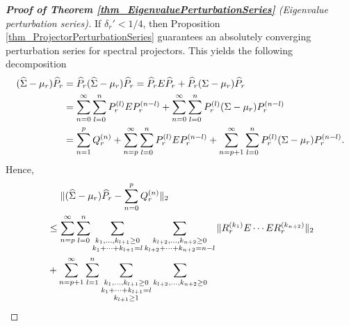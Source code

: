 \documentclass[a4paper,11pt]{article} %
\numberwithin{equation}{section}
\theoremstyle{definition}
\theoremstyle{remark}
\theoremstyle{plain}
\begin{document}
\begin{proof} %
  [\normalfont \textbf{Proof of Theorem \ref{thm_EigenvaluePerturbationSeries}} (Eigenvalue perturbation series)]
  \label{prf_EigenvaluePerturbationSeries} 
  If \( \delta_{r}' < 1/4 \), then Proposition \ref{thm_ProjectorPerturbationSeries} guarantees an absolutely converging perturbation series for spectral projectors.
  This yields the following decomposition
  \begin{align}
                          (\widehat{\Sigma} - \mu_{r}) \widehat{P}_{r}  
    & = 
          \widehat{P}_{r} (\widehat{\Sigma} - \mu_{r}) \widehat{P}_{r}  
      = 
          \widehat{P}_{r} E \widehat{P}_{r} + \widehat{P}_{r} ( \Sigma - \mu_{r} ) \widehat{P}_{r}
    \\
    & =
          \sum_{n = 0}^{\infty} \sum_{l = 0}^{n} P_{r}^{(l)} E                P_{r}^{(n - l)} 
        + \sum_{n = 0}^{\infty} \sum_{l = 0}^{n} P_{r}^{(l)} (\Sigma - \mu_r) P_{r}^{(n - l)} 
    \notag
    \\
    & = 
          \sum_{n = 1}^{p}          Q_{r}^{(n)} 
        + \sum_{n = p    }^{\infty} \sum_{l = 0}^{n} P_{r}^{(l)} E                P_{r}^{(n - l)}
        + \sum_{n = p + 1}^{\infty} \sum_{l = 0}^{n} P_{r}^{(l)} (\Sigma - \mu_r) P_{r}^{(n - l)}.
    \notag
  \end{align}
  Hence,
  \begin{align}
    & \ \ \ \
          \| (\widehat{\Sigma} - \mu_r) \widehat{P}_{r} - \sum_{n = 0}^{p} Q_{r}^{(n)} \|_{2}
    \\
    & \le 
          \sum_{n = p}^{\infty} \sum_{l=0}^{n} 
          \sum_{ \substack{k_{1}, \dots, k_{l + 1} \ge 0 \\
                           k_{1} + \dots + k_{l + 1} = l
                          }
               }
          \sum_{ \substack{k_{l + 2}, \dots,  k_{n + 2} \ge 0 \\
                           k_{l +2} + \dots + k_{n + 2} = n - l 
                          }
               } 
          \| R_{r}^{(k_{1})} E \cdots E R_{r}^{(k_{n + 2})} \|_{2}
    \notag
    \\
    & +   \sum_{n = p + 1}^{\infty} \sum_{l = 1}^{n} 
          \sum_{ \substack{k_{1},  \dots,  k_{l + 1} \ge 0 \\
                           k_{1} + \dots + k_{l + 1} = l \\ 
                           k_{l + 1} \ge 1
                          }
               }
          \sum_{ \substack{k_{l + 2},  \dots,  k_{n + 2} \ge 0 \\
}}
\end{align}
\end{proof}
\end{document}
